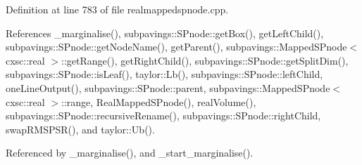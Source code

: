 \-Definition at line 783 of file realmappedspnode.\-cpp.



\-References \-\_\-marginalise(), subpavings\-::\-S\-Pnode\-::get\-Box(), get\-Left\-Child(), subpavings\-::\-S\-Pnode\-::get\-Node\-Name(), get\-Parent(), subpavings\-::\-Mapped\-S\-Pnode$<$ cxsc\-::real $>$\-::get\-Range(), get\-Right\-Child(), subpavings\-::\-S\-Pnode\-::get\-Split\-Dim(), subpavings\-::\-S\-Pnode\-::is\-Leaf(), taylor\-::\-Lb(), subpavings\-::\-S\-Pnode\-::left\-Child, one\-Line\-Output(), subpavings\-::\-S\-Pnode\-::parent, subpavings\-::\-Mapped\-S\-Pnode$<$ cxsc\-::real $>$\-::range, \-Real\-Mapped\-S\-Pnode(), real\-Volume(), subpavings\-::\-S\-Pnode\-::recursive\-Rename(), subpavings\-::\-S\-Pnode\-::right\-Child, swap\-R\-M\-S\-P\-S\-R(), and taylor\-::\-Ub().



\-Referenced by \-\_\-marginalise(), and \-\_\-start\-\_\-marginalise().


